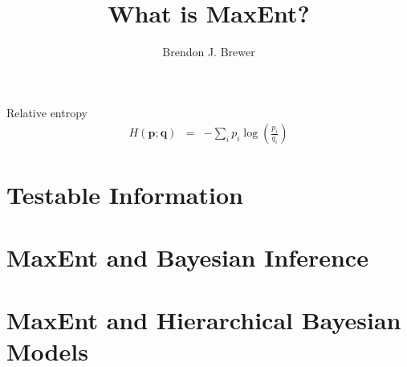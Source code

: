 \documentclass[letterpaper, 11pt]{article}
\title{What is MaxEnt?}
\author{Brendon J. Brewer}
\begin{document}
\maketitle



Relative entropy
\begin{eqnarray}
H(\mathbf{p}; \mathbf{q}) &=& -\sum_i p_i \log\left(\frac{p_i}{q_i}\right) 
\end{eqnarray}

\section{Testable Information}

\section{MaxEnt and Bayesian Inference}

\section{MaxEnt and Hierarchical Bayesian Models}

\begin{thebibliography}{}
\end{thebibliography}
\end{document}
